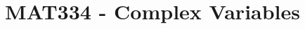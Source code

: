 \documentclass[12pt,oneside]{book}
\title{MAT334 - Complex Variables}
\date{}
\numberwithin{lem}{section}
\numberwithin{thm}{section}
\theoremstyle{definition}
\numberwithin{subcase}{subsection}
\numberwithin{subsubcase}{subcase}
\numberwithin{Def}{section}
\begin{document}
\maketitle

\tableofcontents

















\begin{appendices}




\end{appendices}


\printindex
\end{document}
